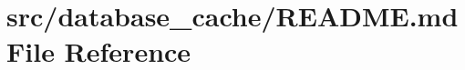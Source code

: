 \hypertarget{src_2database__cache_2README_8md}{}\section{src/database\+\_\+cache/\+R\+E\+A\+D\+ME.md File Reference}
\label{src_2database__cache_2README_8md}
